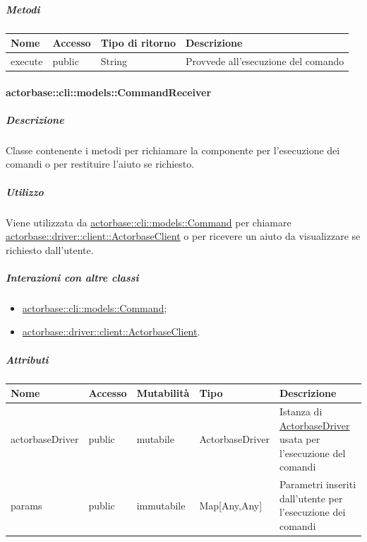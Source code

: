 \documentclass{scalatekids-article}
\begin{document}
\subparagraph{Metodi}

\begin{tabular}{| l | l | l | l |}
  \hline
  Nome & Accesso & Tipo di ritorno & Descrizione\\
  \hline
  execute & public & String & Provvede all'esecuzione del comando\\
  \hline
\end{tabular}

\paragraph{actorbase::cli::models::CommandReceiver}
\label{sec:actorbase::cli::models::CommandReceiver}

\subparagraph{Descrizione}

Classe contenente i metodi per richiamare la componente  per
l'esecuzione dei comandi o per restituire l'aiuto se richiesto.

\subparagraph{Utilizzo}

Viene utilizzata da \hyperref[sec:actorbase::cli::models::Command]{actorbase::cli::models::Command} per chiamare
\hyperref[sec:actorbase::driver::client::ActorbaseClient]{actorbase::driver::client::ActorbaseClient} o per ricevere un aiuto da
visualizzare se richiesto dall'utente.

\subparagraph{Interazioni con altre classi}

\begin{itemize}
\item \hyperref[sec:actorbase::cli::models::Command]{actorbase::cli::models::Command};
\item \hyperref[sec:actorbase::driver::client::ActorbaseClient]{actorbase::driver::client::ActorbaseClient}.
\end{itemize}

\subparagraph{Attributi}

\begin{tabular}{| p{2.5cm} | p{1.5cm} | p{2cm} | p{2.5cm} | p{8.5cm} |}
  \hline
  Nome & Accesso & Mutabilità & Tipo & Descrizione\\
  \hline
  actorbaseDriver & public & mutabile & ActorbaseDriver & Istanza di \hyperref[sec:actorbase::driver::]{ActorbaseDriver} usata per l'esecuzione del comandi\\
  \hline
  params & public & immutabile & Map[Any,Any] & Parametri inseriti dall'utente per l'esecuzione dei comandi\\
  \hline
\end{tabular}
\end{document}
